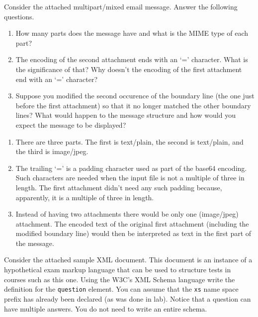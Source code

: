 \documentclass[12pt]{examdesign}
\begin{document}
\begin{shortanswer}
  \begin{question}
    Consider the attached multipart/mixed email message. Answer the following questions.
    \begin{enumerate}
      \item How many parts does the message have and what is the MIME type of each part?
      \item The encoding of the second attachment ends with an `=' character. What is the
      significance of that? Why doesn't the encoding of the first attachment end with an `='
      character?
      \item Suppose you modified the second occurence of the boundary line (the one just before
      the first attachment) so that it no longer matched the other boundary lines? What would
      happen to the message structure and how would you expect the message to be displayed?
    \end{enumerate}
    
    \begin{answer}
      \begin{enumerate}
      
        \item There are three parts. The first is text/plain, the second is text/plain, and the
        third is image/jpeg.
        \item The trailing `=' is a padding character used as part of the base64 encoding. Such
        characters are needed when the input file is not a multiple of three in length. The
        first attachment didn't need any such padding because, apparently, it is a multiple of
        three in length.
        \item Instead of having two attachments there would be only one (image/jpeg) attachment.
        The encoded text of the original first attachment (including the modified boundary line)
        would then be interpreted as text in the first part of the message.
      \end{enumerate}
    \end{answer}
  \end{question}


  \begin{question}
    Consider the attached sample XML document. This document is an instance of a hypothetical
    exam markup language that can be used to structure tests in courses such as this one. Using
    the W3C's XML Schema language write the definition for the \texttt{question} element. You
    can assume that the \texttt{xs} name space prefix has already been declared (as was done in
    lab). Notice that a question can have multiple answers. You do not need to write an entire
    schema.
  \end{question}


\end{shortanswer}
\end{document}

